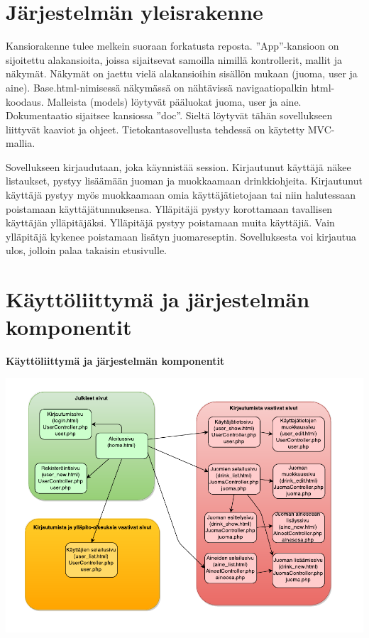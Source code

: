 \documentclass[a4paper]{article}
\begin{document}
\section{Järjestelmän yleisrakenne}

Kansiorakenne tulee melkein suoraan forkatusta reposta. ”App”-kansioon on sijoitettu alakansioita, 
joissa sijaitsevat samoilla nimillä kontrollerit, mallit ja näkymät. Näkymät on jaettu vielä alakansioihin 
sisällön mukaan (juoma, user ja aine). Base.html-nimisessä näkymässä on nähtävissä navigaatiopalkin html-koodaus. Malleista (models) löytyvät pääluokat juoma, user ja aine. Dokumentaatio 
sijaitsee kansiossa ”doc”. Sieltä löytyvät tähän sovellukseen liittyvät kaaviot ja ohjeet. Tietokantasovellusta
tehdessä on käytetty MVC-mallia. 

Sovellukseen kirjaudutaan, joka käynnistää session. Kirjautunut käyttäjä näkee listaukset, pystyy lisäämään juoman ja muokkaamaan 
drinkkiohjeita. Kirjautunut käyttäjä pystyy myös muokkaamaan omia käyttäjätietojaan tai niin halutessaan poistamaan käyttäjätunnuksensa. Ylläpitäjä pystyy korottamaan tavallisen käyttäjän ylläpitäjäksi. Ylläpitäjä pystyy poistamaan muita käyttäjiä. Vain ylläpitäjä kykenee poistamaan lisätyn juomareseptin. Sovelluksesta voi kirjautua ulos, jolloin palaa takaisin etusivulle. 



\newpage
\section{Käyttöliittymä ja järjestelmän komponentit}
\begin{flushleft}\textbf{Käyttöliittymä ja järjestelmän komponentit} \end{flushleft}

\includegraphics[scale=0.8]{sivunakymat.pdf}
\end{document}
